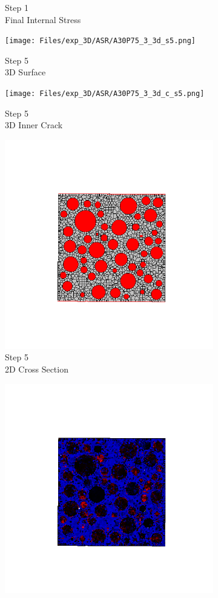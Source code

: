 \begin{figure}[ht!]
\begin{subfigure}{.25\textwidth}
      \caption{Step 1\\Final Internal Stress}
    \end{subfigure}
    \begin{subfigure}{.25\textwidth}
      \centering
      \texttt{[image: Files/exp\_3D/ASR/A30P75\_3\_3d\_s5.png]}
      \caption{Step 5\\3D Surface}
    \end{subfigure}%
    \begin{subfigure}{.25\textwidth}
      \centering
      \texttt{[image: Files/exp\_3D/ASR/A30P75\_3\_3d\_c\_s5.png]}
      \caption{Step 5\\3D Inner Crack}
    \end{subfigure}%
    \begin{subfigure}{.25\textwidth}
      \centering
      \includegraphics[width=.8\linewidth]{Files/exp_3D/ASR/A30P75_3_c5.png}
      \caption{Step 5\\2D Cross Section}
    \end{subfigure}%
    \begin{subfigure}{.25\textwidth}
      \centering
      \includegraphics[width=.8\linewidth]{Files/exp_3D/ASR/A30P75_3_s5.png}

\end{subfigure}
\end{figure}
